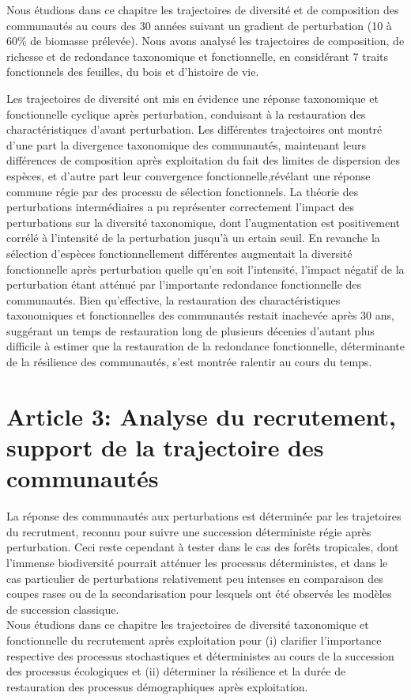 \documentclass[
  11pt,
  french,
  A4paper,
  extrafontsizes,onecolumn,openright
  ]{memoir}
\begin{document}
Nous étudions dans ce chapitre les trajectoires de diversité et de
composition des communautés au cours des 30 années suivant un gradient
de perturbation (10 à 60\% de biomasse prélevée). Nous avons analysé les
trajectoires de composition, de richesse et de redondance taxonomique et
fonctionnelle, en considérant 7 traits fonctionnels des feuilles, du
bois et d'histoire de vie.

Les trajectoires de diversité ont mis en évidence une réponse
taxonomique et fonctionnelle cyclique après perturbation, conduisant à
la restauration des charactéristiques d'avant perturbation. Les
différentes trajectoires ont montré d'une part la divergence taxonomique
des communautés, maintenant leurs différences de composition après
exploitation du fait des limites de dispersion des espèces, et d'autre
part leur convergence fonctionnelle,révélant une réponse commune régie
par des processu de sélection fonctionnels. La théorie des perturbations
intermédiaires a pu représenter correctement l'impact des perturbations
sur la diversité taxonomique, dont l'augmentation est positivement
corrélé à l'intensité de la perturbation jusqu'à un ertain seuil. En
revanche la sélection d'espèces fonctionnellement différentes augmentait
la diversité fonctionnelle après perturbation quelle qu'en soit
l'intensité, l'impact négatif de la perturbation étant atténué par
l'importante redondance fonctionnelle des communautés. Bien
qu'effective, la restauration des charactéristiques taxonomiques et
fonctionnelles des communautés restait inachevée après 30 ans, suggérant
un temps de restauration long de plusieurs décenies d'autant plus
difficile à estimer que la restauration de la redondance fonctionnelle,
déterminante de la résilience des communautés, s'est montrée ralentir au
cours du temps.

\chapter{Article 3: Analyse du recrutement, support de la trajectoire
des
communautés}\label{article-3-analyse-du-recrutement-support-de-la-trajectoire-des-communautes}

La réponse des communautés aux perturbations est déterminée par les
trajetoires du recrutment, reconnu pour suivre une succession
déterministe régie après perturbation. Ceci reste cependant à tester
dans le cas des forêts tropicales, dont l'immense biodiversité pourrait
atténuer les processus déterministes, et dans le cas particulier de
perturbations relativement peu intenses en comparaison des coupes rases
ou de la secondarisation pour lesquels ont été observés les modèles de
succession classique.\\
Nous étudions dans ce chapitre les trajectoires de diversité taxonomique
et fonctionnelle du recrutement après exploitation pour (i) clarifier
l'importance respective des processus stochastiques et déterministes au
cours de la succession des processus écologiques et (ii) déterminer la
résilience et la durée de restauration des processus démographiques
après exploitation.
\end{document}
